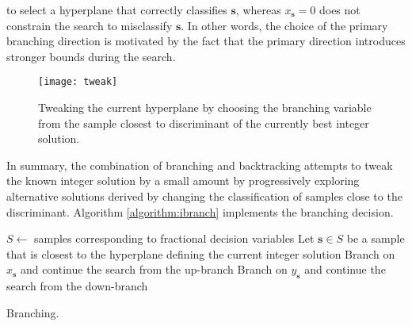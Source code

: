 \documentclass[11pt]{article}
\theoremstyle{definition}
\newcommand{\vect}[1]{\mathbf{#1}}
\newcommand{\sv}[1]{_{\vect{#1}}}
\begin{document}
to select a hyperplane that correctly classifies $\vect{s}$,
whereas $x\sv{s} = 0$ does not constrain the search to misclassify $\vect{s}$.
In other words, the choice of the primary branching direction is
motivated by the fact that the primary direction introduces
stronger bounds during the search.
\begin{figure}
\centering
\texttt{[image: tweak]}
\caption{Tweaking the current hyperplane by choosing
the branching variable from the sample closest to 
discriminant of the currently best integer solution.}
\label{fig:tweak}
\end{figure}
In summary, the combination of branching and backtracking
attempts to tweak the known integer solution by a small amount
by progressively exploring alternative solutions derived by 
changing the classification of samples close to the discriminant.
Algorithm \ref{algorithm:ibranch} implements the branching decision.
\begin{algorithm}
\begin{algorithmic}
\RETURN
\ENDIF
\STATE $S \leftarrow$ samples corresponding to fractional decision variables
\STATE Let $\vect{s} \in S$ be a sample that is closest to the 
hyperplane defining the current integer solution
\IF{$\vect{s} \in P$}
\STATE Branch on $x\sv{s}$ and continue the search from the up-branch
\ELSE
\STATE Branch on $y\sv{s}$ and continue the search from the down-branch
\ENDIF
\end{algorithmic}
\caption{Branching.}
\label{algorithm:ibranch}
\end{algorithm}

\iffalse
Old random method:
At an intermediate node, the branch-and-bound algorithm selects a 
{\em branching variable\/}, which is an integer variable $x\sv{s}$ or $y\sv{s}$
whose optimal value in the relaxation \eqref{eq:linearrelaxation} is fractional.
A variable is said to be {\em eligible\/} at a node if it is an integer variable
and its optimal value in the relaxation is fractional.
In choosing the branching variables, we adopt the following two main ideas.
First, we wish to make sure that $P^+, N^- \neq \emptyset$, which would then
imply that $\vect{w} \neq \vect{0}$. 
Second, we select the branching variable uniformly at random 
among eligible variables. The intuition is that 
the 2-approximation algorithm chooses a random hyperplane,
and selecting random branching variable is a way to emulate it.
By combining, the two ideas, we obtain Algorithm \ref{algorithm:branching}.
\begin{algorithm}
\begin{algorithmic}
\STATE $E_P (E_N) \leftarrow$ set of eligible variables in $P$ ($N$)
\IF{$N^- = \emptyset$}
\IF{$E_N \neq \emptyset$}
\RETURN a random variable in $E_N$
\ELSE
\RETURN a random variable in $E_P$
\ENDIF
\ENDIF
\IF{$P^+ = \emptyset$}
\IF{$E_P \neq \emptyset$}
\RETURN a random variable in $E_P$
\ELSE
\RETURN a random variable in $E_N$
\ENDIF
\ENDIF
\RETURN a random eligible variable in $E_P \cup E_N$
\end{algorithmic}
\caption{Selection of branching variable.}
\label{algorithm:selection}
\end{algorithm}
\fi
\end{document}
